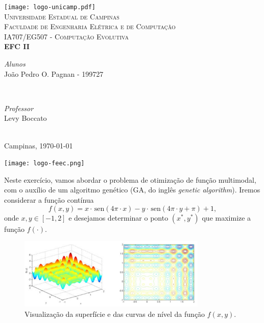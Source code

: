 \documentclass[a4paper, 12pt]{article}
\newcommand{\sen}{\hspace{2pt}\mathrm{sen}}
\begin{document}
\begin{titlepage}
\newcommand{\HRule}{\rule{\linewidth}{0.5mm}}
	
\centering

\texttt{[image: logo-unicamp.pdf]}\\[0.5cm]	
\textsc{\Large Universidade Estadual de Campinas}\\[2.0cm]
\textsc{\large Faculdade de Engenharia Elétrica e de Computação}\\[0.5cm]
	
\textsc{IA707/EG507 - Computação Evolutiva}\\[2.5cm]
	
{\LARGE \bfseries EFC II}\\[3.5cm]

\begin{minipage}[t]{0.4\textwidth}
	\begin{flushleft}
    \textit{Alunos}\\
    João Pedro O. Pagnan - 199727
	\end{flushleft}
\end{minipage}
~
\begin{minipage}[t]{0.4\textwidth}
	\begin{flushright}
		\textit{Professor}\\
		Levy Boccato
	\end{flushright}
\end{minipage}\\[4.5cm]

{Campinas, \today}
	
\vfill\vfill\vfill\vfill\vfill

\texttt{[image: logo-feec.png]}\\[0.5cm]
\vfill 
	
\end{titlepage}

\justify

Neste exercício, vamos abordar o problema de otimização de função multimodal, com o auxílio de um algoritmo genético (GA, do inglês \textit{genetic algorithm}). Iremos considerar a função contínua
$$f (x, y) = x \cdot \sen(4\pi \cdot x) - y \cdot \sen(4\pi \cdot y + \pi) + 1,$$
onde $x, y \in [-1, 2]$ e desejamos determinar o ponto $(x^{*} , y^{*})$ que maximize a função $f(\cdot )$.
\begin{figure}[H]
    \centering
    \includegraphics[width=0.8\textwidth]{figuras/grafico-funcao.png}
    \caption{Visualização da superfície e das curvas de nível da função $f (x, y)$.}
    \label{fig:grafico-funcao}
\end{figure}
\end{document}
